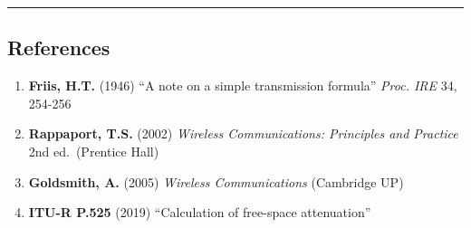 \begin{center}\rule{0.5\linewidth}{0.5pt}\end{center}

\subsection{\texorpdfstring{ References}{ References}}\label{references}

\begin{enumerate}
\def\labelenumi{\arabic{enumi}.}
\tightlist
\item
  \textbf{Friis, H.T.} (1946) ``A note on a simple transmission
  formula'' \emph{Proc. IRE} 34, 254-256
\item
  \textbf{Rappaport, T.S.} (2002) \emph{Wireless Communications:
  Principles and Practice} 2nd ed.~(Prentice Hall)
\item
  \textbf{Goldsmith, A.} (2005) \emph{Wireless Communications}
  (Cambridge UP)
\item
  \textbf{ITU-R P.525} (2019) ``Calculation of free-space attenuation''
\end{enumerate}
